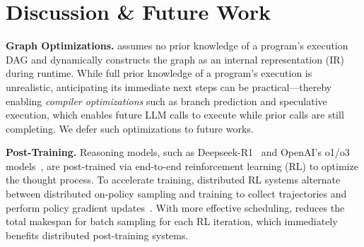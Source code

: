 \section{Discussion \& Future Work}
\noindent \textbf{Graph Optimizations.} \text{\name} assumes no prior knowledge of a program’s execution DAG and dynamically constructs the graph as an internal representation (IR) during runtime. While full prior knowledge of a program’s execution is unrealistic, anticipating its immediate next steps can be practical—thereby enabling \textit{compiler optimizations} such as branch prediction and speculative execution, which enables future LLM calls to execute while prior calls are still completing. We defer such optimizations to future works.

\vspace{1.5mm}
\noindent \textbf{Post-Training.} Reasoning models, such as Deepseek-R1~\cite{deepseekai2025deepseekr1incentivizingreasoningcapability} and OpenAI's o1/o3 models~\cite{openai2025o1}, are post-trained via end-to-end reinforcement learning (RL) to optimize the thought process. To accelerate training, distributed RL systems alternate between distributed on-policy sampling and training to collect trajectories and perform policy gradient updates~\cite{sheng2024hybridflow,rllib}. With more effective scheduling, \text{\name} reduces the total makespan for batch sampling for each RL iteration, which immediately benefits distributed post-training systems.